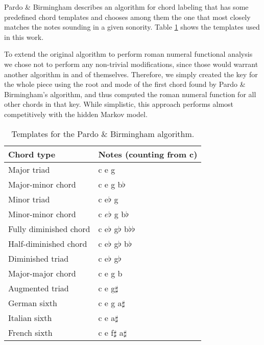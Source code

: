 Pardo \& Birmingham \cite{pardo.ea99:automated} describes an algorithm
for chord labeling that has some predefined chord templates and
chooses among them the one that most closely matches the notes
sounding in a given sonority. Table \ref{tab:templates-pardo} shows
the templates used in this work.

To extend the original algorithm to perform roman numeral functional
analysis we chose not to perform any non-trivial modifications, since
those would warrant another algorithm in and of themselves. Therefore,
we simply created the key for the whole piece using the root and mode
of the first chord found by Pardo \& Birmingham's algorithm, and
thus computed the roman numeral function for all other chords in that
key. While simplistic, this approach performs almost competitively
with the hidden Markov model.

\begin{table}[h]
  \centering
  \begin{small}
    \begin{sc}
      \begin{tabular}[t]{ll} \hline
        Chord type & Notes (counting from c) \\ \hline
        Major triad & c e g \\
        Major-minor chord &  c e g b$\flat$ \\
        Minor triad & c e$\flat$ g \\
        Minor-minor chord & c $e\flat$ g b$\flat$ \\
        Fully diminished chord & c e$\flat$ g$\flat$ b$\flat\flat$ \\
        Half-diminished chord & c e$\flat$ g$\flat$ b$\flat$ \\
        Diminished triad & c e$\flat$ g$\flat$ \\
        Major-major chord & c e g b \\
        Augmented triad & c e g$\sharp$ \\
        German sixth  & c e g a$\sharp$ \\
        Italian sixth & c e a$\sharp$ \\
        French sixth & c e f$\sharp$ a$\sharp$ \\ \hline
      \end{tabular}
    \end{sc}
  \end{small}
  \caption{Templates for the Pardo \& Birmingham algorithm.}
  \label{tab:templates-pardo}
\end{table}

